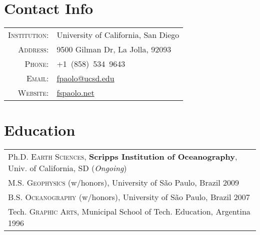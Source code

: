 \documentclass[a4paper,11pt]{article}
\begin{document}
\pagestyle{empty} 



\par{\bigskip\par} %

\section{Contact Info}

\begin{tabular}{rl}
\textsc{Institution:} & University of California, San Diego \\
\textsc{Address:} & 9500 Gilman Dr, La Jolla, 92093 \\
\textsc{Phone:} & +1~(858)~534~9643\\
\textsc{Email:} & \href{mailto:fpaolo@ucsd.edu}{fpaolo@ucsd.edu} \\
\textsc{Website:} & \href{http://fspaolo.net}{fspaolo.net}
\end{tabular}


\section{Education}

\begin{tabular}{l}
Ph.D. \textsc{Earth Sciences}, \textbf{Scripps Institution of Oceanography}, Univ. of California, SD (\emph{Ongoing})\\
M.S. \textsc{Geophysics} (w/honors), University of S\~ao Paulo, Brazil 2009\\
B.S. \textsc{Oceanography} (w/honors), University of S\~ao Paulo, Brazil 2007\\
Tech. \textsc{Graphic Arts}, Municipal School of Tech. Education, Argentina 1996\\
\end{tabular}

\end{document}
